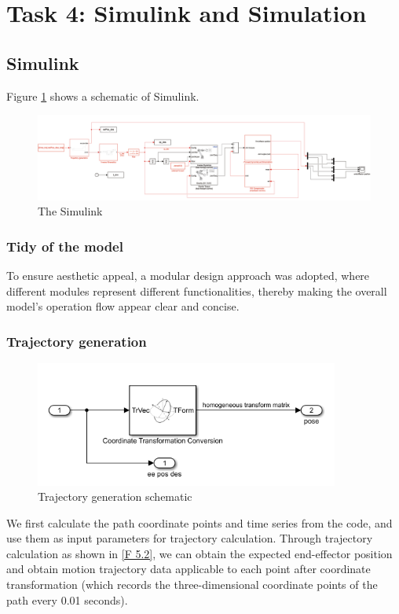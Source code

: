 \section{Task 4: Simulink and Simulation}
\FloatBarrier %

\subsection{Simulink}
Figure \ref{F 5.1} shows a schematic of Simulink.
\begin{figure}[htp]
    \centering
    \includegraphics[width=17cm]{./fig/sim.jpg}
    \caption{The Simulink}
    \label{F 5.1}
\end{figure}

\subsubsection*{Tidy of the model}
To ensure aesthetic appeal, a modular design approach was adopted, where different modules represent different functionalities, thereby making the overall model's operation flow appear clear and concise.

\subsubsection*{Trajectory generation}

\begin{figure}[htbp]
    \centering
    \includegraphics[width=10cm]{./fig/traj.png}
    \caption{Trajectory generation schematic}
    \label{F 5.2}
\end{figure}

We first calculate the path coordinate points and time series from the code, and use them as input parameters for trajectory calculation. Through trajectory calculation as shown in \autoref{F 5.2}, we can obtain the expected end-effector position and obtain motion trajectory data applicable to each point after coordinate transformation (which records the three-dimensional coordinate points of the path every 0.01 seconds).

